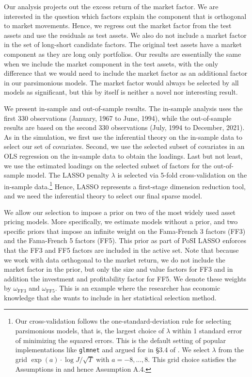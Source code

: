 \documentclass[11pt]{article}
\begin{document}
Our analysis projects out the excess return of the market factor. We are interested in the question which factors explain the component that is orthogonal to market movements. Hence, we regress out the market factor from the test assets and use the residuals as test assets. We also do not include a market factor in the set of long-short candidate factors. The original test assets have a market component as they are long only portfolios. Our results are essentially the same when we include the market component in the test assets, with the only difference that we would need to include the market factor as an additional factor in our parsimonious models. The market factor would always be selected by all models as significant, but this by itself is neither a novel nor interesting result.  

We present in-sample and out-of-sample results. The in-sample analysis uses the first 330 observations (January, 1967 to June, 1994), while the out-of-sample results are based on the second 330 observations (July, 1994 to December, 2021). As in the simulation, we first use the inferential theory on the in-sample data to select our set of covariates. Second, we use the selected subset of covariates in an OLS regression on the in-sample data to obtain the loadings. Last but not least, we use the estimated loadings on the selected subset of factors for the out-of-sample model. The LASSO penalty $\lambda$ is selected via 5-fold cross-validation on the in-sample data.\footnote{Our cross-validation follows the one-standard-deviation rule for selecting parsimonious models, that is, the largest choice of $\lambda$ within 1 standard error of minimizing the squared errors. This is the default setting of popular implementations like \texttt{glmnet} and argued for in \S3.4 of \cite{hastie2009elements}. We select $\lambda$ from the grid $\exp(a)\cdot \log J/\sqrt{T}$ with $a=-8,...,8$. This grid choice satisfies the Assumptions in \cite{chatterjee2014assumptionless} and hence Assumption A.4.} Hence, LASSO represents a first-stage dimension reduction tool, and we need the inferential theory to select our final sparse model.



We allow our selection to impose a prior on two of the most widely used asset pricing models. More specifically, we estimate models without a prior, and two specific priors that impose an infinite weight on the Fama-French 3 factors (FF3) and the Fama-French 5 factors (FF5). This prior as part of PoSI LASSO enforces that the FF3 and FF5 factors are included in the active set. Note that because we work with data orthogonal to the market return, we do not include the market factor in the prior, but only the size and value factors for FF3 and in addition the investment and profitability factor for FF5. We denote these weights by $\omega_{\text{FF3}}$ and $\omega_{\text{FF5}}$. This is an example where the researcher has economic knowledge that she wants to include in her statistical selection method. 
\end{document}
